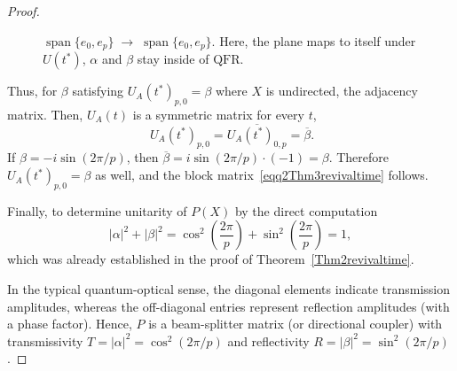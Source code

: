 \documentclass[12pt]{amsart}
\newcommand{\QFR}{\mathrm{QFR}}
\begin{document}
\begin{proof}
\begin{figure}[H]
    \centering
{}
    \caption{$\operatorname{span}\{e_0,e_p\} \;\longrightarrow\; \operatorname{span}\{e_0,e_p\}$. Here, the plane maps to itself under $U(t^*)$, $\alpha$ and $\beta$ stay inside of $\QFR$.}
    \label{figtim02}
\end{figure}

Thus, for $\beta$ satisfying $U_A(t^*)_{p,0}=\beta$ where $X$ is undirected, the adjacency matrix. Then, $U_A(t)$ is a symmetric matrix for every $t$, 
\begin{equation}~\label{eqq4Thm3revivaltime}
 U_A(t^*)_{p,0} = \overline{U_A(t^*)_{0,p}} = \overline{\beta}.   
\end{equation}
If $\beta=-i\sin(2\pi/p)$, then $\overline{\beta}=i\sin(2\pi/p)\cdot(-1)=\beta$. Therefore $U_A(t^*)_{p,0}=\beta$ as well, and the block matrix~\eqref{eqq2Thm3revivaltime} follows.

  Finally,  to determine unitarity of $P(X)$ by the direct computation
  \[
    |\alpha|^2 + |\beta|^2 = \cos^2\!\left(\frac{2\pi}{p}\right) + \sin^2\!\left(\frac{2\pi}{p}\right) = 1,
  \]
  which was already established in the proof of Theorem~\ref{Thm2revivaltime}. 

  In the typical quantum-optical sense, the diagonal elements indicate transmission amplitudes, whereas the off-diagonal entries represent reflection amplitudes (with a phase factor). Hence, $P$ is a beam-splitter matrix (or directional coupler) with transmissivity
  $T=|\alpha|^2=\cos^2(2\pi/p)$ and reflectivity $R=|\beta|^2=\sin^2(2\pi/p)$.
\end{proof}
\end{document}

